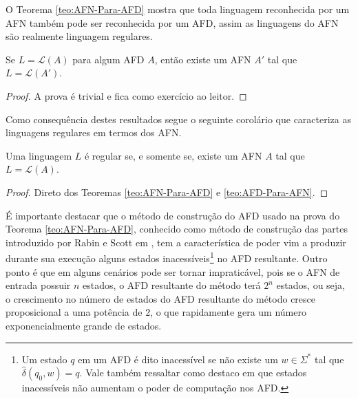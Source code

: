 O Teorema \ref{teo:AFN-Para-AFD} mostra que toda linguagem reconhecida por um AFN também pode ser reconhecida por um AFD, assim as linguagens do AFN são realmente linguagem regulares.

\begin{theorem}\label{teo:AFD-Para-AFN}
	Se $L = \mathcal{L}(A)$ para algum AFD $A$, então existe um AFN $A'$ tal que $L = \mathcal{L}(A')$.
\end{theorem}

\begin{proof}
	A prova é trivial e fica como exercício ao leitor.
\end{proof}

Como consequência destes resultados segue o seguinte corolário que caracteriza as linguagens regulares em termos dos AFN.

\begin{corollary}\label{col:CaracterizandoRegulares}
	Uma linguagem $L$ é regular se, e somente se, existe um AFN $A$ tal que $L = \mathcal{L}(A)$.
\end{corollary}

\begin{proof}
	Direto dos Teoremas \ref{teo:AFN-Para-AFD} e \ref{teo:AFD-Para-AFN}.
\end{proof}

É importante destacar que o método de construção do AFD usado na prova do Teorema \ref{teo:AFN-Para-AFD}, conhecido como método de construção das partes introduzido por Rabin e Scott em \cite{rabin1959}, tem a característica de poder vim a produzir durante sua execução alguns estados inacessíveis\footnote{Um estado $q$ em um AFD é dito inacessível se não existe um $w \in \Sigma^*$ tal que $\widehat{\delta}(q_0, w) = q$. Vale também ressaltar como destaco em \cite{benjaLivro2010, hopcroft2008} que estados inacessíveis não aumentam o poder de computação nos AFD.} no AFD resultante.  Outro ponto é que em alguns cenários pode ser tornar impraticável, pois se o AFN de entrada possuir $n$ estados, o AFD resultante do método terá $2^n$ estados, ou seja, o crescimento no número de estados do AFD resultante do método cresce proposicional a uma potência de 2, o que rapidamente gera um número exponencialmente grande de estados. 

